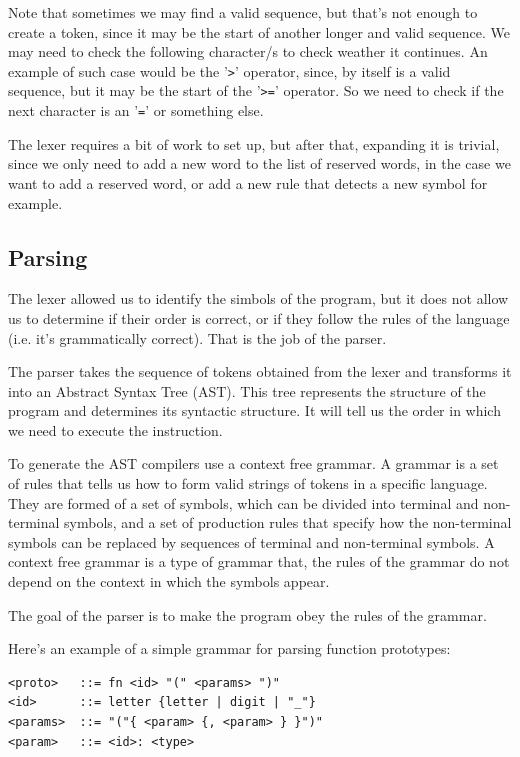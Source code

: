 ﻿\documentclass[10pt,a4paper,twocolumn,twoside]{article}
\begin{document}
Note that sometimes we may find a valid sequence, but that's not enough to
create a token, since it may be the start of another longer and valid sequence.
We may need to check the following character/s to check weather it continues. An
example of such case would be the '\texttt{>}' operator, since, by itself is a
valid sequence, but it may be the start of the '\texttt{>=}' operator. So we
need to check if the next character is an '\texttt{=}' or something else.

The lexer requires a bit of work to set up, but after that, expanding it is 
trivial, since we only need to add a new word to the list of reserved words, in 
the case we want to add a reserved word, or add a new rule that detects a new 
symbol for example.


\subsection{Parsing}
The lexer allowed us to identify the simbols of the program, but it does not 
allow us to determine if their order is correct, or if they follow the rules of
the language (i.e. it's grammatically correct). That is the job of the parser.

The parser takes the sequence of tokens obtained from the lexer and
transforms it into an Abstract Syntax Tree (AST). This tree represents the
structure of the program and determines its syntactic structure. It will tell us
the order in which we need to execute the instruction.

To generate the AST compilers use a context free grammar. A grammar is a set of
rules that tells us how to form valid strings of tokens in a specific language.
They are formed of a set of symbols, which can be divided into terminal and
non-terminal symbols, and a set of production rules that specify how the
non-terminal symbols can be replaced by sequences of terminal and non-terminal
symbols. A context free grammar is a type of grammar that, the rules of the grammar do
not depend on the context in which the symbols appear.

The goal of the parser is to make the program obey the rules of the grammar.

Here's an example of a simple grammar for parsing function prototypes:

\begin{small}
\begin{verbatim}
<proto>   ::= fn <id> "(" <params> ")"
<id>      ::= letter {letter | digit | "_"}
<params>  ::= "("{ <param> {, <param> } }")"
<param>   ::= <id>: <type>
\end{verbatim}
\end{small}
\end{document}
